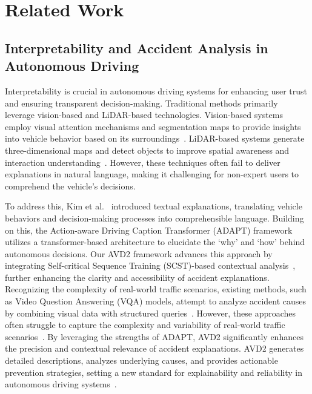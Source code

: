 \section{Related Work}
\subsection{Interpretability and Accident Analysis in Autonomous Driving}

Interpretability is crucial in autonomous driving systems for enhancing user trust and ensuring transparent decision-making. Traditional methods primarily leverage vision-based and LiDAR-based technologies. Vision-based systems employ visual attention mechanisms and segmentation maps to provide insights into vehicle behavior based on its surroundings~\cite{kim2017interpretable}. LiDAR-based systems generate three-dimensional maps and detect objects to improve spatial awareness and interaction understanding~\cite{zeng2019end}. However, these techniques often fail to deliver explanations in natural language, making it challenging for non-expert users to comprehend the vehicle's decisions.

To address this, Kim et al.~\cite{kim2018textual} introduced textual explanations, translating vehicle behaviors and decision-making processes into comprehensible language. Building on this, the Action-aware Driving Caption Transformer (ADAPT) framework~\cite{jin2023adapt} utilizes a transformer-based architecture to elucidate the ‘why’ and ‘how’ behind autonomous decisions. Our AVD2 framework advances this approach by integrating Self-critical Sequence Training (SCST)-based contextual analysis~\cite{bujimalla2020b}, further enhancing the clarity and accessibility of accident explanations. Recognizing the complexity of real-world traffic scenarios, existing methods, such as Video Question Answering (VQA) models, attempt to analyze accident causes by combining visual data with structured queries~\cite{xu2021sutd,liu2023cross}. However, these approaches often struggle to capture the complexity and variability of real-world traffic scenarios~\cite{le2020hierarchical}. By leveraging the strengths of ADAPT, AVD2 significantly enhances the precision and contextual relevance of accident explanations. AVD2 generates detailed descriptions, analyzes underlying causes, and provides actionable prevention strategies, setting a new standard for explainability and reliability in autonomous driving systems~\cite{nahata2021assessing,hwang2024safe,ding2024hint,li2023understanding}.

